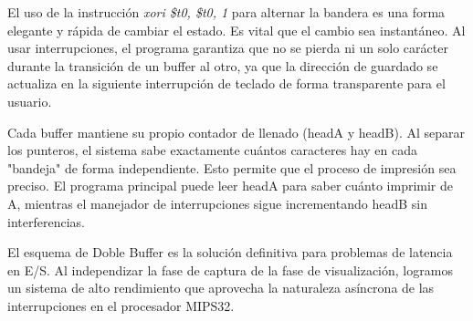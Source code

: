 \documentclass[12pt]{article}
\begin{document}
El uso de la instrucción \textit{xori \$t0, \$t0, 1} para alternar la bandera es una forma elegante y rápida de cambiar el estado. Es vital que el cambio sea instantáneo. Al usar interrupciones, el programa garantiza que no se pierda ni un solo carácter durante la transición de un buffer al otro, ya que la dirección de guardado se actualiza en la siguiente interrupción de teclado de forma transparente para el usuario.

Cada buffer mantiene su propio contador de llenado (headA y headB). Al separar los punteros, el sistema sabe exactamente cuántos caracteres hay en cada "bandeja" de forma independiente. Esto permite que el proceso de impresión sea preciso. El programa principal puede leer headA para saber cuánto imprimir de A, mientras el manejador de interrupciones sigue incrementando headB sin interferencias.

El esquema de Doble Buffer es la solución definitiva para problemas de latencia en E/S. Al independizar la fase de captura de la fase de visualización, logramos un sistema de alto rendimiento que aprovecha la naturaleza asíncrona de las interrupciones en el procesador MIPS32.
\end{document}
